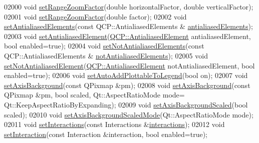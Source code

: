 \begin{DoxyCode}
02000   \textcolor{keywordtype}{void} \hyperlink{a00116_ab0589ec79b1081b13ffb7cf5791a8735}{setRangeZoomFactor}(\textcolor{keywordtype}{double} horizontalFactor, \textcolor{keywordtype}{double} verticalFactor);
02001   \textcolor{keywordtype}{void} \hyperlink{a00116_ab0589ec79b1081b13ffb7cf5791a8735}{setRangeZoomFactor}(\textcolor{keywordtype}{double} factor);
02002   \textcolor{keywordtype}{void} \hyperlink{a00116_af6f91e5eab1be85f67c556e98c3745e8}{setAntialiasedElements}(\textcolor{keyword}{const} QCP::AntialiasedElements &
      \hyperlink{a00116_acc24388098ddb95f5a651cede3f34b99}{antialiasedElements});
02003   \textcolor{keywordtype}{void} \hyperlink{a00116_aeef813bcf7efab8e765f9f87ec454691}{setAntialiasedElement}(\hyperlink{a00143_ae55dbe315d41fe80f29ba88100843a0c}{QCP::AntialiasedElement} 
      antialiasedElement, \textcolor{keywordtype}{bool} enabled=\textcolor{keyword}{true});
02004   \textcolor{keywordtype}{void} \hyperlink{a00116_ae10d685b5eabea2999fb8775ca173c24}{setNotAntialiasedElements}(\textcolor{keyword}{const} QCP::AntialiasedElements &
      \hyperlink{a00116_ad611ed86732d07774545f5bd4b7f18b7}{notAntialiasedElements});
02005   \textcolor{keywordtype}{void} \hyperlink{a00116_afc657938a707c890e449ae89203a076d}{setNotAntialiasedElement}(\hyperlink{a00143_ae55dbe315d41fe80f29ba88100843a0c}{QCP::AntialiasedElement} 
      notAntialiasedElement, \textcolor{keywordtype}{bool} enabled=\textcolor{keyword}{true});
02006   \textcolor{keywordtype}{void} \hyperlink{a00116_ad8858410c2db47b7104040a3aa61c3fc}{setAutoAddPlottableToLegend}(\textcolor{keywordtype}{bool} on);
02007   \textcolor{keywordtype}{void} \hyperlink{a00116_a6e61739de7485e99171c0fd5a57e27aa}{setAxisBackground}(\textcolor{keyword}{const} QPixmap &pm);
02008   \textcolor{keywordtype}{void} \hyperlink{a00116_a6e61739de7485e99171c0fd5a57e27aa}{setAxisBackground}(\textcolor{keyword}{const} QPixmap &pm, \textcolor{keywordtype}{bool} scaled, Qt::AspectRatioMode mode=
      Qt::KeepAspectRatioByExpanding);
02009   \textcolor{keywordtype}{void} \hyperlink{a00116_a55ad8c13d7db8b5c2f15d694773a43a3}{setAxisBackgroundScaled}(\textcolor{keywordtype}{bool} scaled);
02010   \textcolor{keywordtype}{void} \hyperlink{a00116_a82920d0db6cc36214dc4a9dfe386d1a1}{setAxisBackgroundScaledMode}(Qt::AspectRatioMode mode);
02011   \textcolor{keywordtype}{void} \hyperlink{a00116_add9cc886ff5257f64fb4117cf6c135fe}{setInteractions}(\textcolor{keyword}{const} Interactions &\hyperlink{a00116_aa9966a7b4022af4909a34d9a31f6b229}{interactions});
02012   \textcolor{keywordtype}{void} \hyperlink{a00116_af9af5370ddc6e57f3e15809c1576cc38}{setInteraction}(\textcolor{keyword}{const} Interaction &interaction, \textcolor{keywordtype}{bool} enabled=\textcolor{keyword}{true});

\end{DoxyCode}
